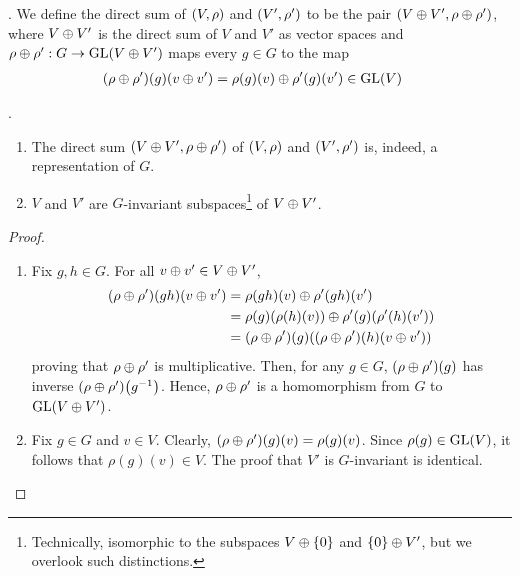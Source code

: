 \begin{boxdefinition}\label{Ch1:Def:Dir_Sum_Reps}
    . We define the direct sum of $\left( V,\rho \right)$ and $\left( V', \rho' \right)$ to be the pair $\left( V \oplus V', \rho \oplus \rho' \right)$, where $V \oplus V'$ is the direct sum of $V$ and $V'$ as vector spaces and $\rho \oplus \rho' : G \to \operatorname{GL}\!\left( V \oplus V' \right)$ maps every $g \in G$ to the map
    \begin{align*}
        \left( \rho \oplus \rho' \right)\!\left( g \right)\!\left( v \oplus v' \right) &= \rho(g)(v) \oplus \rho'(g)(v') \in \operatorname{GL}\!\left( V \right)
    \end{align*}
\end{boxdefinition}
\begin{proposition}
    .
    \begin{enumerate}[label = \normalfont \arabic*., noitemsep]
        \item The direct sum $\left( V \oplus V', \rho \oplus \rho' \right)$ of $\left( V,\rho \right)$ and $\left( V', \rho' \right)$ is, indeed, a representation of $G$.
        \item $V$ and $V'$ are $G$-invariant subspaces\footnote{Technically, isomorphic to the subspaces $V \oplus \left\{ 0 \right\}$ and $\left\{ 0 \right\} \oplus V'$, but we overlook such distinctions.} of $V \oplus V'$.
    \end{enumerate}
\end{proposition}
\begin{proof}
    \hfill
    \begin{enumerate}[noitemsep]
        \item Fix $g,h \in G$. For all $v \oplus v' \in V \oplus V'$,
        \begin{align*}
            \left( \rho \oplus \rho' \right)\!(gh)(v \oplus v') &= \rho(gh)(v) \oplus \rho'(gh)(v') \\
            &= \rho(g)\!\left( \rho(h)(v) \right) \oplus \rho'(g)\!\left( \rho'(h)(v') \right) \\
            &= \left( \rho \oplus \rho' \right)\!(g)\!\left( \left( \rho \oplus \rho' \right)\!(h)(v \oplus v') \right)
        \end{align*}
        proving that $\rho \oplus \rho'$ is multiplicative. Then, for any $g \in G$, $\left( \rho \oplus \rho' \right)\!(g)$ has inverse $\left( \rho \oplus \rho' \right)\!\left( g^{-1} \right)$. Hence, $\rho \oplus \rho'$ is a homomorphism from $G$ to $\operatorname{GL}\!\left( V \oplus V' \right)$.

        \item Fix $g \in G$ and $v \in V$. Clearly, $\left( \rho \oplus \rho' \right)\!(g)(v) = \rho(g)(v)$. Since $\rho(g) \in \operatorname{GL}\!\left( V \right)$, it follows that $\rho(g)(v) \in V$. The proof that $V'$ is $G$-invariant is identical.
    \end{enumerate}
    \vspace{-1em}
\end{proof}

